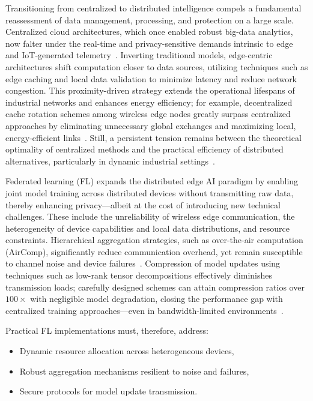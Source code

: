 \documentclass[11pt]{article}
\begin{document}
Transitioning from centralized to distributed intelligence compels a fundamental reassessment of data management, processing, and protection on a large scale. Centralized cloud architectures, which once enabled robust big-data analytics, now falter under the real-time and privacy-sensitive demands intrinsic to edge and IoT-generated telemetry~\cite{ref10,ref11}. Inverting traditional models, edge-centric architectures shift computation closer to data sources, utilizing techniques such as edge caching and local data validation to minimize latency and reduce network congestion. This proximity-driven strategy extends the operational lifespans of industrial networks and enhances energy efficiency; for example, decentralized cache rotation schemes among wireless edge nodes greatly surpass centralized approaches by eliminating unnecessary global exchanges and maximizing local, energy-efficient links~\cite{ref11}. Still, a persistent tension remains between the theoretical optimality of centralized methods and the practical efficiency of distributed alternatives, particularly in dynamic industrial settings~\cite{ref10,ref11}.

Federated learning (FL) expands the distributed edge AI paradigm by enabling joint model training across distributed devices without transmitting raw data, thereby enhancing privacy—albeit at the cost of introducing new technical challenges. These include the unreliability of wireless edge communication, the heterogeneity of device capabilities and local data distributions, and resource constraints. Hierarchical aggregation strategies, such as over-the-air computation (AirComp), significantly reduce communication overhead, yet remain susceptible to channel noise and device failures~\cite{ref23}. Compression of model updates using techniques such as low-rank tensor decompositions effectively diminishes transmission loads; carefully designed schemes can attain compression ratios over $100\times$ with negligible model degradation, closing the performance gap with centralized training approaches—even in bandwidth-limited environments~\cite{ref23}.

Practical FL implementations must, therefore, address:
\begin{itemize}
    \item Dynamic resource allocation across heterogeneous devices,
    \item Robust aggregation mechanisms resilient to noise and failures,
    \item Secure protocols for model update transmission.
\end{itemize}
\end{document}
